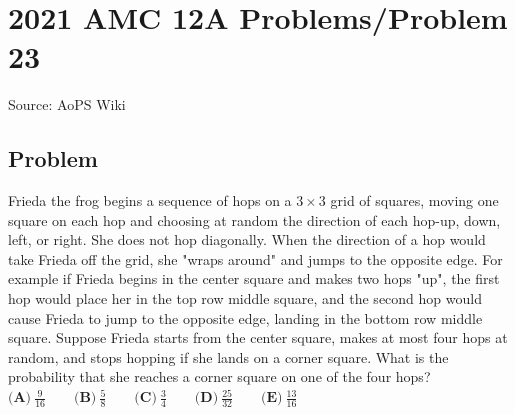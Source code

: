 \documentclass[12pt]{article}
\begin{document}
\section*{{2021 AMC 12A Problems/Problem 23}}
Source: AoPS Wiki

\subsection*{Problem}
Frieda the frog begins a sequence of hops on a $3 \times 3$ grid of squares, moving one square on each hop and choosing at random the direction of each hop-up, down, left, or right. She does not hop diagonally. When the direction of a hop would take Frieda off the grid, she "wraps around" and jumps to the opposite edge. For example if Frieda begins in the center square and makes two hops "up", the first hop would place her in the top row middle square, and the second hop would cause Frieda to jump to the opposite edge, landing in the bottom row middle square. Suppose Frieda starts from the center square, makes at most four hops at random, and stops hopping if she lands on a corner square. What is the probability that she reaches a corner square on one of the four hops? $\textbf{(A)} ~\frac{9}{16}\qquad\textbf{(B)} ~\frac{5}{8}\qquad\textbf{(C)} ~\frac{3}{4}\qquad\textbf{(D)} ~\frac{25}{32}\qquad\textbf{(E)} ~\frac{13}{16}$
\end{document}
